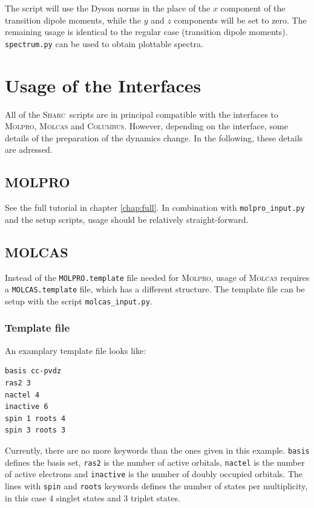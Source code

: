\documentclass[a4paper,11pt,DIV=15,openany]{scrbook}
\newcommand{\sharc}{\textsc{Sharc}}
\newcommand{\ttt}[1]{\texttt{#1}}
\begin{document}
\normalsize
The script will use the Dyson norms in the place of the $x$ component of the transition dipole moments, while the $y$ and $z$ components will be set to zero. The remaining usage is identical to the regular case (transition dipole moments). \ttt{spectrum.py} can be used to obtain plottable spectra.

\chapter{Usage of the Interfaces}

All of the \sharc\ scripts are in principal compatible with the interfaces to \textsc{Molpro}, \textsc{Molcas} and \textsc{Columbus}. However, depending on the interface, some details of the preparation of the dynamics change. In the following, these details are adressed.

\section{MOLPRO}

See the full tutorial in chapter \ref{chap:full}. In combination with \ttt{molpro\_input.py} and the setup scripts, usage should be relatively straight-forward.

\section{MOLCAS}

Instead of the \ttt{MOLPRO.template} file needed for \textsc{Molpro}, usage of \textsc{Molcas} requires a \ttt{MOLCAS.template} file, which has a different structure. The template file can be setup with the script \ttt{molcas\_input.py}.

\subsection{Template file}

An examplary template file looks like:
\begin{oframed}
\footnotesize\begin{Verbatim}[commandchars=\\\{\}]
basis cc-pvdz
ras2 3
nactel 4
inactive 6
spin 1 roots 4
spin 3 roots 3
\end{Verbatim}
\end{oframed}

Currently, there are no more keywords than the ones given in this example. \ttt{basis} defines the basis set, \ttt{ras2} is the number of active orbitals, \ttt{nactel} is the number of active electrons and \ttt{inactive} is the number of doubly occupied orbitals. 
The lines with \ttt{spin} and \ttt{roots} keywords defines the number of states per multiplicity, in this case 4 singlet states and 3 triplet states.
\end{document}
